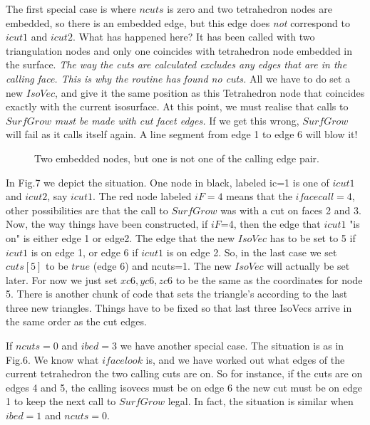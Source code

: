 \documentclass[12pt]{article}
\begin{document}
The first special case is where $ncuts$ is zero and 
two tetrahedron nodes are embedded, so there
is an embedded edge, but this edge does {\it not} correspond to $icut1$ and
$icut2$. What has happened here? It has been called with two triangulation
 nodes and only one coincides with tetrahedron node embedded 
in the surface. {\it The way the cuts are calculated excludes any
edges that are in the calling face.  This is why the
routine has found no cuts.} All we have to do set
a new $IsoVec$, and give it the same position as this Tetrahedron
node that coincides exactly with the current isosurface.
At this point, we must realise that calls to $SurfGrow$ {\it
must be made with cut facet edges.} If we get this wrong, $SurfGrow$
 will fail as it calls itself again. A line segment from edge 1
 to edge 6 will blow it!

\begin{figure}
\vspace*{14cm}
\caption{Two embedded nodes, but one is not one of  the calling edge pair.}
\end{figure}

In Fig.7 we depict the situation. One node in black, labeled ic=1
 is one of $icut1$ and $icut2$, say $icut1$. The red node labeled $iF=4$
means that the $ifacecall=4$, other possibilities are that the
call to $SurfGrow$ was with a cut on faces 2 and 3. Now, the
way things have been constructed, if $iF$=4, then the edge
that $icut1$ "is on" is either edge 1 or edge2. The edge
that the new $IsoVec$ has to be set to 5 if $icut1$ is on edge 1,
 or edge 6 if $icut1$ is on edge 2. So, in the last case we set
 $cuts[5]$ to be $true$ (edge 6) and ncuts=1. The new $IsoVec$
will actually be set later. For now we just set $xc6, yc6, zc6$
to be the same as the coordinates for node 5. There is another chunk
of code that sets the triangle's according to the last three new
 triangles. Things have to be fixed so that last three IsoVecs
 arrive in the same order as the cut edges.

If $ncuts=0$ and $ibed=3$ we have another special case. The situation
is as in Fig.6. We know what $ifacelook$ is, and we have worked out what
edges of the current tetrahedron the two calling cuts are on. So for
instance, if the cuts are on edges 4 and 5, the calling
isovecs must be on edge 6 the new cut must be on edge 1 to keep the
 next call to $SurfGrow$ legal. In fact, the situation is similar
when $ibed=1$ and $ncuts=0$.
\end{document}
